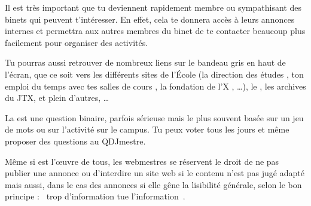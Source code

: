 Il est tr\`es important que tu deviennent rapidement membre ou sympathisant des binets qui peuvent t'int\'eresser.
En effet, cela te donnera acc\`es \`a leurs annonces internes et permettra aux autres membres du binet de te 
contacter beaucoup plus facilement pour organiser des activit\'es.


Tu pourras aussi retrouver de nombreux liens sur le bandeau gris en haut de l'écran, que ce soit vers les différents sites de l'\'Ecole (la direction des études , ton emploi du temps avec tes salles de cours , la fondation de l'X , \dots), le , les archives du JTX, et plein d'autres, \dots


La  est une question binaire, parfois s\'erieuse mais le
plus souvent bas\'ee sur un jeu de mots ou sur l'activit\'e sur le
campus. Tu peux voter tous les jours et m\^eme proposer des questions
au QDJmestre.

M\^eme si \fkz est l'\oe uvre de tous, les webmestres se r\'eservent le droit de ne pas publier une annonce ou d'interdire un site web si le contenu
n'est pas jug\'e adapt\'e mais aussi, dans le cas des annonces si elle g\^ene la lisibilit\'e g\'en\'erale, selon le bon principe : \guillemotleft~trop
d'information tue l'information~\guillemotright .

